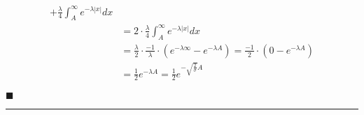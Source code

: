 \documentclass[a4paper,12pt]{article}
\begin{document}
\begin{enumerate}
\begin{align*}
                      + \frac{\lambda}{4}\int_{A}^{\infty}e^{-\lambda|x|}dx \\ 
                     &= 2 \cdot \frac{\lambda}{4}\int_{A}^{\infty}e^{-\lambda|x|}dx \\ 
                     &= \frac{\lambda}{2} \cdot \frac{-1}{\lambda} \cdot (e^{-\lambda \infty} - e^{-\lambda A}) = \frac{-1}{2} \cdot (0 - e^{-\lambda A}) \\
                     &= \frac{1}{2}e^{-\lambda A} = \frac{1}{2}e^{-\sqrt{\frac{2}{\sigma}}A}
            \end{align*}
            \begin{flushright}
                $\blacksquare$
            \end{flushright}
    \end{enumerate}
    \rule{\textwidth}{0.4pt}
\end{document}
